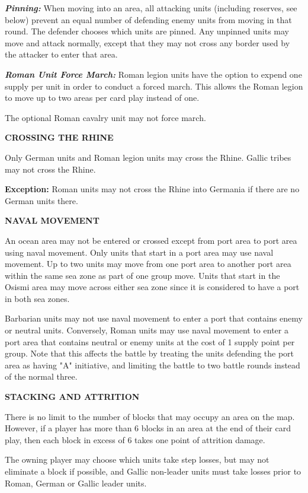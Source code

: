\textit{\textbf{Pinning:}} When moving into an area, all attacking units (including reserves, see below) prevent an equal number of defending enemy units from moving in that round. The defender chooses which units are pinned. Any unpinned units may move and attack normally, except that they may not cross any border used by the attacker to enter that area.

\textit{\textbf{Roman Unit Force March:}} Roman legion units have the option to expend one supply per unit in order to conduct a forced march. This allows the Roman legion to move up to two areas per card play instead of one.

The optional Roman cavalry unit may not force march.

\textbf{CROSSING THE RHINE}
\par
Only German units and Roman legion units may cross the Rhine. Gallic tribes may not cross the Rhine.

\textbf{Exception:} Roman units may not cross the Rhine into Germania if there are no German units there.

\textbf{NAVAL MOVEMENT}
\par
An ocean area may not be entered or crossed except from port area to port area using naval movement. Only units that start in a port area may use naval movement. Up to two units may move from one port area to another port area within the same sea zone as part of one group move. Units that start in the Osismi area may move across either sea zone since it is considered to have a port in both sea zones.

Barbarian units may not use naval movement to enter a port that contains enemy or neutral units. Conversely, Roman units may use naval movement to enter a port area that contains neutral or enemy units at the cost of 1 supply point per group. Note that this affects the battle by treating the units defending the port area as having "A" initiative, and limiting the battle to two battle rounds instead of the normal three.

\textbf{STACKING AND ATTRITION}
\par
There is no limit to the number of blocks that may occupy an area on the map. However, if a player has more than 6 blocks in an area at the end of their card play, then each block in excess of 6 takes one point of attrition damage.

The owning player may choose which units take step losses, but may not eliminate a block if possible, and Gallic non-leader units must take losses prior to Roman, German or Gallic leader units.

